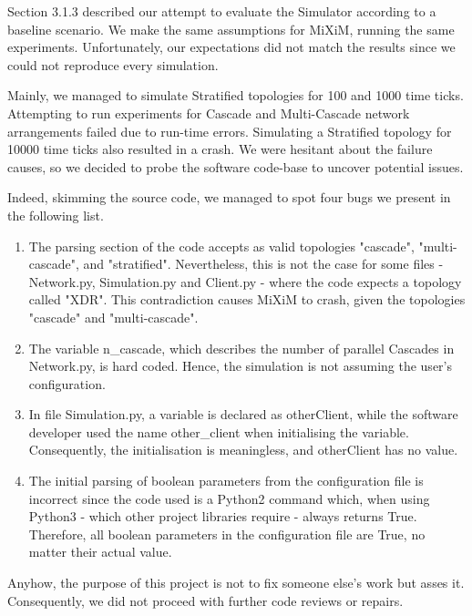 \documentclass[logo,msc,cyber]{infthesis}   %
\begin{document}
Section 3.1.3 described our attempt to evaluate the Simulator according to a
baseline scenario. We make the same assumptions for MiXiM, running the same
experiments. Unfortunately, our expectations did not match the results since we
could not reproduce every simulation.

Mainly, we managed to simulate Stratified topologies for 100 and 1000 time
ticks. Attempting to run experiments for Cascade and Multi-Cascade network
arrangements failed due to run-time errors. Simulating a Stratified topology for
10000 time ticks also resulted in a crash. We were hesitant about the failure
causes, so we decided to probe the software code-base to uncover potential
issues.

Indeed, skimming the source code, we managed to spot four bugs we present in the following list. 

\begin{enumerate}
    \item The parsing section of the code accepts as valid topologies "cascade",
    "multi-cascade", and "stratified". Nevertheless, this is not the case for
    some files - Network.py, Simulation.py and Client.py - where the code
    expects a topology called "XDR". This contradiction causes MiXiM to crash,
    given the topologies "cascade" and "multi-cascade". 
    \item The variable n\_cascade, which describes the number of parallel
    Cascades in Network.py, is hard coded. Hence, the simulation is not assuming
    the user's configuration.
    \item In file Simulation.py, a variable is declared as otherClient, while
    the software developer used the name other\_client when initialising the
    variable. Consequently, the initialisation is meaningless, and otherClient
    has no value.
    \item The initial parsing of boolean parameters from the configuration file
    is incorrect since the code used is a Python2 command which, when using
    Python3 - which other project libraries require - always returns True.
    Therefore, all boolean parameters in the configuration file are True, no
    matter their actual value.
\end{enumerate}

Anyhow, the purpose of this project is not to fix someone else's work but asses
it. Consequently, we did not proceed with further code reviews or repairs.
\end{document}
